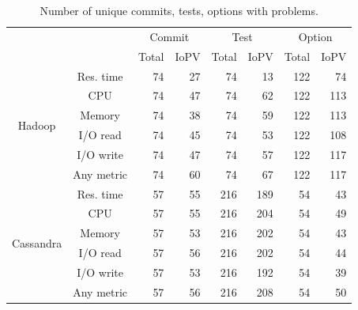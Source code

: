 \begin{table}[t]
    \centering
    \caption{Number of unique commits, tests, options with \inconsistent problems.} %
    \begin{tabular}{|c|c|r|r|r|r|r|r|}
    \hline
    \multirow{2}{*}{}          & \multirow{2}{*}{} & \multicolumn{2}{c|}{Commit}      & \multicolumn{2}{c|}{Test}        & \multicolumn{2}{c|}{Option}      \\ \cline{3-8} 
         &                   & \multicolumn{1}{c|}{Total} & \multicolumn{1}{c|}{IoPV} & \multicolumn{1}{c|}{Total} & \multicolumn{1}{c|}{IoPV} & \multicolumn{1}{c|}{Total} & \multicolumn{1}{c|}{IoPV} \\ \hline
    \multirow{6}{*}{Hadoop}    & Res. time         & 74   & 27  & 74   & 13  & 122  & 74  \\ \cline{2-8} 
         & CPU               & 74   & 47  & 74   & 62  & 122  & 113 \\ \cline{2-8} 
         & Memory            & 74   & 38  & 74   & 59  & 122  & 113 \\ \cline{2-8} 
         & I/O read          & 74   & 45  & 74   & 53  & 122  & 108 \\ \cline{2-8} 
         & I/O write         & 74   & 47  & 74   & 57  & 122  & 117 \\ \cline{2-8} 
         & Any metric        & 74   & 60  & 74   & 67  & 122  & 117 \\ \hline
    \multirow{6}{*}{Cassandra} & Res. time         & 57   & 55  & 216  & 189 & 54   & 43  \\ \cline{2-8} 
         & CPU               & 57   & 55  & 216  & 204 & 54   & 49  \\ \cline{2-8} 
         & Memory            & 57   & 53  & 216  & 202 & 54   & 43  \\ \cline{2-8} 
         & I/O read          & 57   & 56  & 216  & 202 & 54   & 44  \\ \cline{2-8} 
         & I/O write         & 57   & 53  & 216  & 192 & 54   & 39  \\ \cline{2-8} 
         & Any metric        & 57   & 56  & 216  & 208 & 54   & 50  \\ \hline
    \end{tabular}
    \label{tab:dimemssion_regression}
\end{table}

